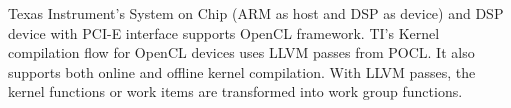 Texas Instrument's System on Chip (ARM as host and DSP as device)\cite{15} and DSP device with PCI-E interface supports OpenCL framework. TI's Kernel compilation flow for OpenCL devices uses LLVM passes from POCL. It also supports both online and offline kernel compilation. With LLVM passes, the kernel functions or work items are transformed into work group functions.
